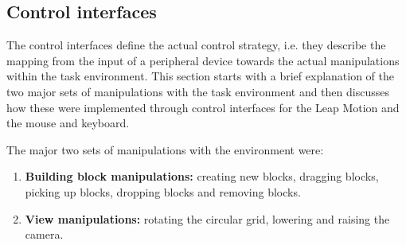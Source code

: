 \subsection{Control interfaces}\label{sec:interface}
The control interfaces define the actual control strategy, i.e. they describe the mapping from the input of a peripheral device towards the actual manipulations within the 
task environment. This section starts with a brief explanation of the two major sets of manipulations with the task environment and then discusses how these were implemented
 through control interfaces for the Leap Motion and the mouse and keyboard. 

The major two sets of manipulations with the environment were:
\begin{enumerate}
	\item{\textbf{Building block manipulations:}} creating new blocks, dragging blocks, picking up blocks, dropping blocks and removing blocks.
	\item{\textbf{View manipulations:}} rotating the circular grid, lowering and raising the camera.
\end{enumerate}


